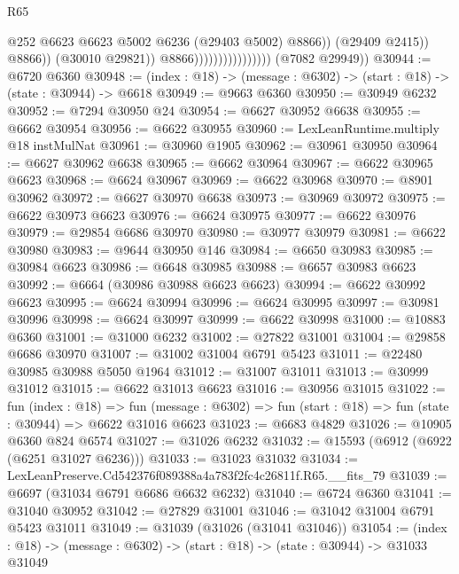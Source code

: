 \begin{lexlean}{R65}
\begin{coremodule}
{                                                  @252
                                                  @6623
                                                  @6623
                                                  @5002
                                                  @6236
                                                  (@29403 @5002)
                                                  @8866))
                                              (@29409 @2415))
                                            @8866))
                                        (@30010 @29821))
                                      @8866))))))))))))))))
      (@7082 @29949))
@30944 := @6720 @6360
@30948 := (index : @18) -> (message : @6302) -> (start : @18) -> (state : @30944) -> @6618
@30949 := @9663 @6360
@30950 := @30949 @6232
@30952 := @7294 @30950 @24
@30954 := @6627 @30952 @6638
@30955 := @6662 @30954
@30956 := @6622 @30955
@30960 := LexLeanRuntime.multiply @18 instMulNat
@30961 := @30960 @1905
@30962 := @30961 @30950
@30964 := @6627 @30962 @6638
@30965 := @6662 @30964
@30967 := @6622 @30965 @6623
@30968 := @6624 @30967
@30969 := @6622 @30968
@30970 := @8901 @30962
@30972 := @6627 @30970 @6638
@30973 := @30969 @30972
@30975 := @6622 @30973 @6623
@30976 := @6624 @30975
@30977 := @6622 @30976
@30979 := @29854 @6686 @30970
@30980 := @30977 @30979
@30981 := @6622 @30980
@30983 := @9644 @30950 @146
@30984 := @6650 @30983
@30985 := @30984 @6623
@30986 := @6648 @30985
@30988 := @6657 @30983 @6623
@30992 := @6664 (@30986 @30988 @6623 @6623)
@30994 := @6622 @30992 @6623
@30995 := @6624 @30994
@30996 := @6624 @30995
@30997 := @30981 @30996
@30998 := @6624 @30997
@30999 := @6622 @30998
@31000 := @10883 @6360
@31001 := @31000 @6232
@31002 := @27822 @31001
@31004 := @29858 @6686 @30970
@31007 := @31002 @31004 @6791 @5423
@31011 := @22480 @30985 @30988 @5050 @1964
@31012 := @31007 @31011
@31013 := @30999 @31012
@31015 := @6622 @31013 @6623
@31016 := @30956 @31015
@31022 := fun (index : @18) =>
  fun (message : @6302) => fun (start : @18) => fun (state : @30944) => @6622 @31016 @6623
@31023 := @6683 @4829
@31026 := @10905 @6360 @824 @6574
@31027 := @31026 @6232
@31032 := @15593 (@6912 (@6922 (@6251 @31027 @6236)))
@31033 := @31023 @31032
@31034 := LexLeanPreserve.Cd542376f089388a4a783f2fc4c26811f.R65.__fits_79
@31039 := @6697 (@31034 @6791 @6686 @6632 @6232)
@31040 := @6724 @6360
@31041 := @31040 @30952
@31042 := @27829 @31001
@31046 := @31042 @31004 @6791 @5423 @31011
@31049 := @31039 (@31026 (@31041 @31046))
@31054 := (index : @18) -> (message : @6302) -> (start : @18) -> (state : @30944) -> @31033 @31049
}
\end{coremodule}
\end{lexlean}
